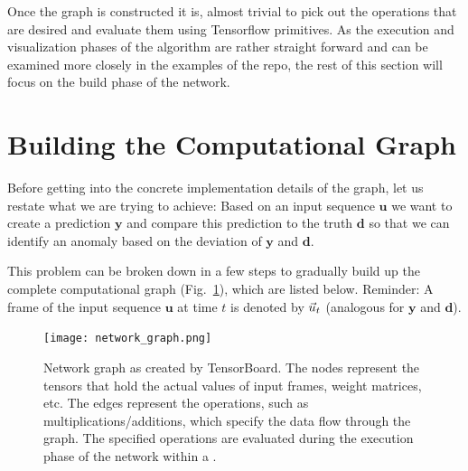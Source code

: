 Once the graph is constructed it is, almost trivial to pick out the operations
that are desired and evaluate them using Tensorflow primitives. As the
execution and visualization phases of the algorithm are rather straight forward
and can be examined more closely in the examples of the  repo, the
rest of this section will focus on the build phase of the network. 


\section{Building the Computational Graph}%
\label{sec:building_the_computational_graph}

Before getting into the concrete implementation details of the graph, let us
restate what we are trying to achieve:  Based on an input sequence $\mathbf{u}$
we want to create a prediction $\mathbf{y}$ and compare this prediction to the
truth $\mathbf{d}$ so that we can identify an anomaly based on the deviation of
$\mathbf{y}$ and $\mathbf{d}$. 

This problem can be broken down in a few steps to gradually build up the
complete computational graph (Fig.~\ref{fig:network_graph}), which are listed
below.  Reminder: A frame of the input sequence $\mathbf{u}$ at time $t$ is
denoted by $\vec{u}_t$ (analogous for $\mathbf{y}$ and $\mathbf{d}$).

\begin{figure}
  \centering
  \texttt{[image: network\_graph.png]}
  \caption{Network graph as created by TensorBoard. The nodes represent the
  tensors that hold the actual values of input frames, weight matrices, etc.
  The edges represent the operations, such as multiplications/additions, which
  specify the data flow through the graph. The specified operations are evaluated
  during the execution phase of the network within a .}
  \label{fig:network_graph}
\end{figure}


